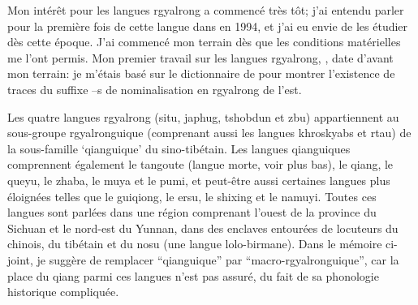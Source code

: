 \documentclass[oldfontcommands,oneside,a4paper,11pt]{memoir}
\begin{document}
Mon intérêt pour les langues rgyalrong a commencé très tôt; j'ai entendu parler pour la première fois de cette langue dans \citet{delancey87st} en 1994, et j'ai eu envie de les étudier   dès cette époque. J'ai commencé mon terrain dès que les conditions matérielles me l'ont permis. Mon premier travail sur les langues rgyalrong, \citet{jacques03s.houzhui}, date d'avant mon terrain: je m'étais basé sur le dictionnaire de \citet{huangsun02} pour montrer l'existence de traces du suffixe --s de nominalisation en rgyalrong de l'est.



Les quatre langues rgyalrong (situ, japhug, tshobdun et zbu) appartiennent au sous-groupe rgyalronguique (comprenant aussi les langues khroskyabs et rtau) de la sous-famille `qianguique' du sino-tibétain. Les langues qianguiques comprennent également le tangoute (langue morte, voir plus bas), le qiang, le queyu, le zhaba, le muya et le pumi, et peut-être aussi certaines langues plus éloignées telles que le guiqiong, le ersu, le shixing et le namuyi. Toutes ces langues sont parlées dans une région comprenant l’ouest de la province du Sichuan et le nord-est du Yunnan, dans des enclaves entourées de locuteurs du chinois, du tibétain et du nosu (une langue lolo-birmane). Dans le mémoire ci-joint, je suggère de remplacer ``qianguique'' par ``macro-rgyalronguique'', car la place du qiang parmi ces langues n'est pas assuré, du fait de sa phonologie historique compliquée.
\end{document}
